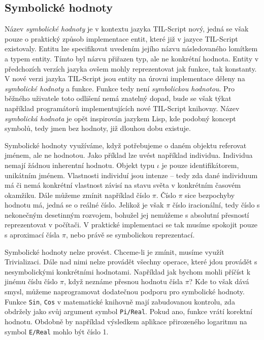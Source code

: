 \subsection{Symbolické hodnoty}\label{symbolic-values}

Název \textit{symbolické hodnoty} je v kontextu jazyka TIL-Script nový, jedná se však pouze o
praktický způsob implementace entit, které již v jazyce TIL-Script existovaly. Entitu lze
specifikovat uvedením jejího názvu následovaného lomítkem a typem entity. Tímto byl názvu přiřazen
typ, ale ne konkrétní hodnota. Entity v předchozích verzích jazyka ovšem mohly reprezentovat jak
funkce, tak konstanty. V nové verzi jazyka TIL-Script jsou entity na úrovni implementace děleny
na \textit{symbolické hodnoty} a funkce. Funkce tedy není \textit{symbolickou hodnotou}.
Pro běžného uživatele toto odlišení nemá znatelný dopad, bude se však týkat například programátorů
implementujících nové TIL-Script knihovny. Název \textit{symbolická hodnota} je opět inspirován
jazykem Lisp, kde podobný koncept symbolů, tedy jmen bez hodnoty, již dlouhou dobu existuje.

Symbolické hodnoty využíváme, když potřebujeme o daném objektu referovat jménem, ale ne hodnotou.
Jako příklad lze uvést například individua. Individua nemají žádnou inherentní hodnotu. Objekt
typu $\iota$ je pouze identifikátorem, unikátním jménem. Vlastnosti individuí jsou intenze -- tedy zda
dané individuum má či nemá konkrétní vlastnost závisí na stavu světa v konkrétním časovém okamžiku.
Dále můžeme zmínit například číslo $\pi$. Číslo $\pi$ sice bezpochyby hodnotu má, jedná se o reálné
číslo. Jelikož je však $\pi$ číslo iracionální, tedy číslo s nekonečným desetinným rozvojem, bohužel
jej nemůžeme s absolutní přesností reprezentovat v počítači. V praktické implementaci se tak musíme
spokojit pouze s aproximací čísla $\pi$, nebo právě se symbolickou reprezentací.

Symbolické hodnoty nelze provést. Chceme-li je zmínit, musíme využít Trivializaci. Dále nad nimi
nelze provádět všechny operace, které jdou provádět s nesymbolickými konkrétními hodnotami.
Například jak bychom mohli příčíst k jinému číslu číslo $\pi$, když neznáme přesnou hodnotu čísla
$\pi$? Kde to však dává smysl, můžeme naprogramovat dodatečnou podporu pro symbolické hodnoty.
Funkce \lstinline{Sin}, \lstinline{Cos} v matematické knihovně mají zabudovanou kontrolu, zda
obdržely jako svůj argument symbol \lstinline{Pi/Real}. Pokud ano, funkce vrátí korektní
hodnotu. Obdobně by například výsledkem aplikace přirozeného logaritmu na symbol \lstinline{E/Real}
mohlo být číslo 1.

